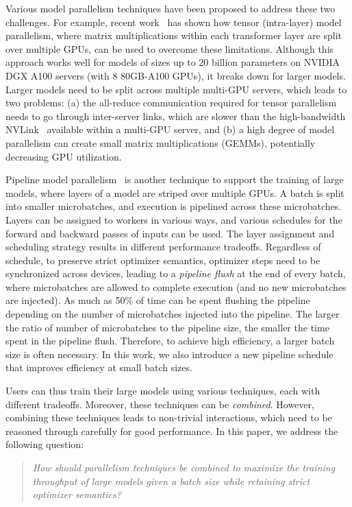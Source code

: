 \documentclass[sigconf,nonacm]{acmart}
\begin{document}
Various model parallelism techniques have been proposed to address these two challenges. For example, recent work~\cite{mesh_tf,shoeybi2019megatron} has shown how tensor (intra-layer) model parallelism, where matrix multiplications within each transformer layer are split over multiple GPUs, can be used to overcome these limitations. Although this approach works well for models of sizes up to 20 billion parameters on NVIDIA DGX A100 servers (with 8 80GB-A100 GPUs), it breaks down for larger models. Larger models need to be split across multiple multi-GPU servers, which leads to two problems: (a) the all-reduce communication required for tensor parallelism needs to go through inter-server links, which are slower than the high-bandwidth NVLink~\cite{nvlink} available within a multi-GPU server, and (b) a high degree of model parallelism can create small matrix multiplications (GEMMs), potentially decreasing GPU utilization.

Pipeline model parallelism~\cite{narayanan2019pipedream, huang2019gpipe,narayanan2021memory, yang2021pipemare, pb2021kosson, fan2021dapple} is another technique to support the training of large models, where layers of a model are striped over multiple GPUs. A batch is split into smaller microbatches, and execution is pipelined across these microbatches. Layers can be assigned to workers in various ways, and various schedules for the forward and backward passes of inputs can be used. The layer assignment and scheduling strategy results in different performance tradeoffs. Regardless of schedule, to preserve strict optimizer semantics, optimizer steps need to be synchronized across devices, leading to a \emph{pipeline flush} at the end of every batch, where microbatches are allowed to complete execution (and no new microbatches are injected). As much as 50\% of time can be spent flushing the pipeline depending on the number of microbatches injected into the pipeline. The larger the ratio of number of microbatches to the pipeline size, the smaller the time spent in the pipeline flush. Therefore, to achieve high efficiency, a larger batch size is often necessary. In this work, we also introduce a new pipeline schedule that improves efficiency at small batch sizes.

Users can thus train their large models using various techniques, each with different tradeoffs. Moreover, these techniques can be \emph{combined}. However, combining these techniques leads to non-trivial interactions, which need to be reasoned through carefully for good performance. In this paper, we address the following question:
\begin{quote}
    \emph{How should parallelism techniques be combined to maximize the training throughput of large models given a batch size while retaining strict optimizer semantics?}
\end{quote}
\end{document}
